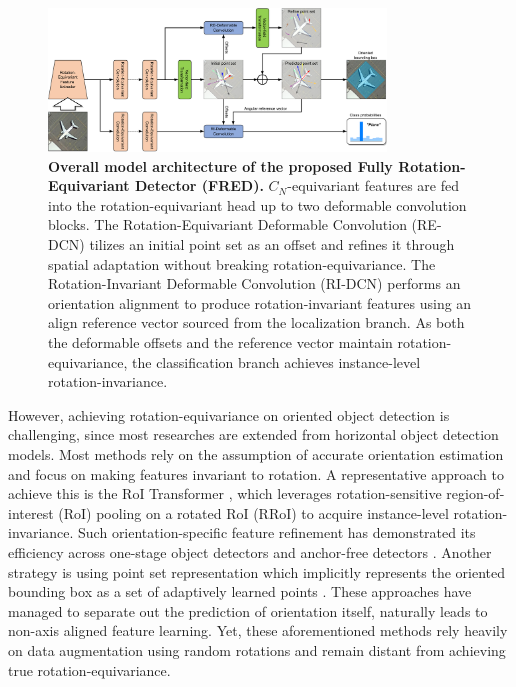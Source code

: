 \documentclass[letterpaper]{article} %
\begin{document}
\begin{figure}[t]
\centering
\includegraphics[width=0.8\textwidth]{figs/Figure3-v3.pdf}
\caption{\textbf{Overall model architecture of the proposed Fully Rotation-Equivariant Detector (FRED).} \( C_N \)-equivariant features are fed into the rotation-equivariant head up to two deformable convolution blocks. The Rotation-Equivariant Deformable Convolution (RE-DCN) tilizes an initial point set as an offset and refines it through spatial adaptation without breaking rotation-equivariance. The Rotation-Invariant Deformable Convolution (RI-DCN) performs an orientation alignment to produce rotation-invariant features using an align reference vector sourced from the localization branch. As both the deformable offsets and the reference vector maintain rotation-equivariance, the classification branch achieves instance-level rotation-invariance.}
\label{fig:figure2}
\end{figure}
However, achieving rotation-equivariance on oriented object detection is challenging, since most researches are extended from horizontal object detection models. Most methods rely on the assumption of accurate orientation estimation and focus on making features invariant to rotation. A representative approach to achieve this is the RoI Transformer \citep{roitransformer}, which leverages rotation-sensitive region-of-interest (RoI) pooling on a rotated RoI (RRoI) to acquire instance-level rotation-invariance. Such orientation-specific feature refinement has demonstrated its efficiency across one-stage object detectors \citep{han2021s2anet} and anchor-free detectors \citep{pan2020drn}. Another strategy is using point set representation which implicitly represents the oriented bounding box as a set of adaptively learned points \citep{guo2021beyond, li2022oriented}. These approaches have managed to separate out the prediction of orientation itself, naturally leads to non-axis aligned feature learning. Yet, these aforementioned methods rely heavily on data augmentation using random rotations and remain distant from achieving true rotation-equivariance.
\end{document}
